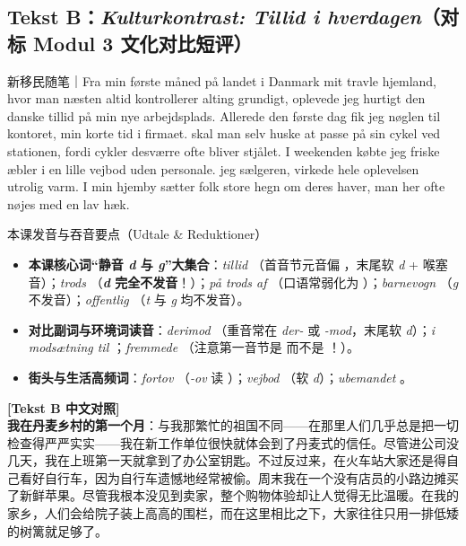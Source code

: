 \subsection*{Tekst B：\textit{Kulturkontrast: Tillid i hverdagen}（对标 Modul 3 文化对比短评）}

\begin{emailbox}{新移民随笔｜Fra min første måned på landet i Danmark}
 mit travle hjemland, hvor man næsten altid kontrollerer alting grundigt, oplevede jeg hurtigt den danske tillid på min nye arbejdsplads. Allerede den første dag fik jeg nøglen til kontoret,  min korte tid i firmaet.  skal man selv huske at passe på sin cykel ved stationen, fordi cykler desværre ofte bliver stjålet. I weekenden købte jeg friske æbler i en lille vejbod uden personale.  jeg  sælgeren, virkede hele oplevelsen utrolig varm. I min hjemby sætter folk store hegn om deres haver,  man her  ofte nøjes med en lav hæk.
\end{emailbox}

\begin{tipbox}{本课发音与吞音要点（Udtale \& Reduktioner）}
\begin{itemize}
  \item \textbf{本课核心词“静音 \textit{d} 与 \textit{g}”大集合}：\textit{tillid} （首音节元音偏 ，末尾软 \textit{d} + 喉塞音）；\textit{trods} （\textbf{\textit{d} 完全不发音}！）；\textit{på trods af} （口语常弱化为 ）；\textit{barnevogn} （\textit{g} 不发音）；\textit{offentlig} （\textit{t} 与 \textit{g} 均不发音）。
  \item \textbf{对比副词与环境词读音}：\textit{derimod} （重音常在 \textit{der-} 或 \textit{-mod}，末尾软 \textit{d}）；\textit{i modsætning til} ；\textit{fremmede} （注意第一音节是  而不是 ！）。
  \item \textbf{街头与生活高频词}：\textit{fortov} （\textit{-ov} 读 ）；\textit{vejbod} （软 \textit{d}）；\textit{ubemandet} 。
\end{itemize}
\end{tipbox}

\begin{transbox}
\small
\textbf{\color{NCDTeal}[Tekst B 中文对照]}\\
\textbf{我在丹麦乡村的第一个月}：与我那繁忙的祖国不同——在那里人们几乎总是把一切检查得严严实实——我在新工作单位很快就体会到了丹麦式的信任。尽管进公司没几天，我在上班第一天就拿到了办公室钥匙。不过反过来，在火车站大家还是得自己看好自行车，因为自行车遗憾地经常被偷。周末我在一个没有店员的小路边摊买了新鲜苹果。尽管我根本没见到卖家，整个购物体验却让人觉得无比温暖。在我的家乡，人们会给院子装上高高的围栏，而在这里相比之下，大家往往只用一排低矮的树篱就足够了。
\end{transbox}

